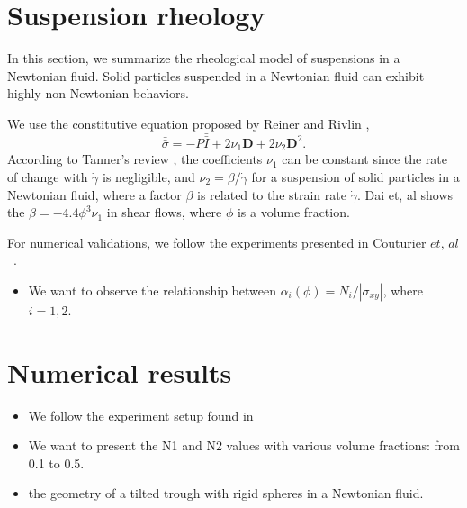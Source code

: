 \section{Suspension rheology}
In this section, we summarize the rheological model of suspensions in a Newtonian fluid. Solid particles suspended in a Newtonian fluid can exhibit highly non-Newtonian behaviors.  
\par
We use the constitutive equation proposed by Reiner \cite{reiner_mathematical_1945} and Rivlin \cite{rivlin_stress-deformation_1955},  
\begin{equation}
  \bar{\bar{\sigma}} = -P \bar{\bar{I}}
  + 2 \nu_1 {\bm{D}} + 2 \nu_2 {\bm{D}}^2.
\end{equation}
According to Tanner's review \cite{tanner_review_2018}, the coefficients $\nu_1$ can be constant since the rate of change with $\dot{\gamma}$ is negligible, and $\nu_2 = \beta / \dot{\gamma}$ for a suspension of solid particles in a Newtonian fluid, where a factor $\beta$ is related to the strain rate $\dot{\gamma}$. Dai et, al \cite{dai_viscometric_2013} shows the $\beta = -4.4 \phi^3 \nu_1$ in shear flows, where $\phi$ is a volume fraction. 
\par
For numerical validations, we follow the experiments presented in Couturier $\textit{et, al}$~\cite{couturier_suspensions_2011}.
\begin{itemize}
  \item We want to observe the relationship between $\alpha_i(\phi) = N_i / |\sigma_{xy}|$, where $i = 1,2$.
\end{itemize}

\section{Numerical results}
\begin{itemize}
  \item We follow the experiment setup found in \cite{couturier_suspensions_2011}
  \item We want to present the N1 and N2 values with various volume fractions: from 0.1 to 0.5.
  \item the geometry of a tilted trough with rigid spheres in a Newtonian fluid. 
\end{itemize}

